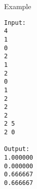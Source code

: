 Example
\begin{verbatim}
Input:
4
1
0
2
1
2
0
1
2
2
2
2 5
2 0

Output:
1.000000
0.000000
0.666667
0.666667
\end{verbatim}